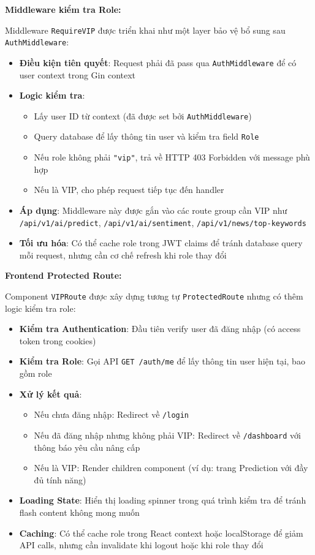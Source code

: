 \noindent\textbf{Middleware kiểm tra Role:}

Middleware \texttt{RequireVIP} được triển khai như một layer bảo vệ bổ sung sau \texttt{AuthMiddleware}:
\begin{itemize}
    \item \textbf{Điều kiện tiên quyết}: Request phải đã pass qua \texttt{AuthMiddleware} để có user context trong Gin context
    \item \textbf{Logic kiểm tra}: 
    \begin{itemize}
        \item Lấy user ID từ context (đã được set bởi \texttt{AuthMiddleware})
        \item Query database để lấy thông tin user và kiểm tra field \texttt{Role}
        \item Nếu role không phải \texttt{"vip"}, trả về HTTP 403 Forbidden với message phù hợp
        \item Nếu là VIP, cho phép request tiếp tục đến handler
    \end{itemize}
    \item \textbf{Áp dụng}: Middleware này được gắn vào các route group cần VIP như \texttt{/api/v1/ai/predict}, \texttt{/api/v1/ai/sentiment}, \texttt{/api/v1/news/top-keywords}
    \item \textbf{Tối ưu hóa}: Có thể cache role trong JWT claims để tránh database query mỗi request, nhưng cần cơ chế refresh khi role thay đổi
\end{itemize}

\noindent\textbf{Frontend Protected Route:}

Component \texttt{VIPRoute} được xây dựng tương tự \texttt{ProtectedRoute} nhưng có thêm logic kiểm tra role:
\begin{itemize}
    \item \textbf{Kiểm tra Authentication}: Đầu tiên verify user đã đăng nhập (có access token trong cookies)
    \item \textbf{Kiểm tra Role}: Gọi API \texttt{GET /auth/me} để lấy thông tin user hiện tại, bao gồm role
    \item \textbf{Xử lý kết quả}:
    \begin{itemize}
        \item Nếu chưa đăng nhập: Redirect về \texttt{/login}
        \item Nếu đã đăng nhập nhưng không phải VIP: Redirect về \texttt{/dashboard} với thông báo yêu cầu nâng cấp
        \item Nếu là VIP: Render children component (ví dụ: trang Prediction với đầy đủ tính năng)
    \end{itemize}
    \item \textbf{Loading State}: Hiển thị loading spinner trong quá trình kiểm tra để tránh flash content không mong muốn
    \item \textbf{Caching}: Có thể cache role trong React context hoặc localStorage để giảm API calls, nhưng cần invalidate khi logout hoặc khi role thay đổi
\end{itemize}

